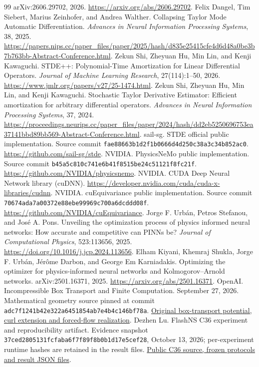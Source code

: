\documentclass[11pt]{article}
\begin{document}
\begin{thebibliography}{99}
arXiv:2606.29702, 2026.
\url{https://arxiv.org/abs/2606.29702}.
Felix Dangel, Tim Siebert, Marius Zeinhofer, and Andrea Walther.
Collapsing Taylor Mode Automatic Differentiation.
\emph{Advances in Neural Information Processing Systems}, 38, 2025.
\url{https://papers.nips.cc/paper_files/paper/2025/hash/d835e25415cfe4d6d48a0be3b7b763bb-Abstract-Conference.html}.
Zekun Shi, Zheyuan Hu, Min Lin, and Kenji Kawaguchi.
STDE++: Polynomial-Time Amortization for Linear Differential Operators.
\emph{Journal of Machine Learning Research}, 27(114):1--50, 2026.
\url{https://www.jmlr.org/papers/v27/25-1474.html}.
Zekun Shi, Zheyuan Hu, Min Lin, and Kenji Kawaguchi.
Stochastic Taylor Derivative Estimator: Efficient amortization for arbitrary differential operators.
\emph{Advances in Neural Information Processing Systems}, 37, 2024.
\url{https://proceedings.neurips.cc/paper_files/paper/2024/hash/dd2eb5250696753ea37141bbd89bb569-Abstract-Conference.html}.
sail-sg. STDE official public implementation.
Source commit \texttt{fae88663b1d2f1b0666d4d250c38a3c34b852ac0}.
\url{https://github.com/sail-sg/stde}.
NVIDIA. PhysicsNeMo public implementation.
Source commit \texttt{b45a5c810c741e6b41f8515be24c51121f8fc21f}.
\url{https://github.com/NVIDIA/physicsnemo}.
NVIDIA. CUDA Deep Neural Network library (cuDNN).
\url{https://developer.nvidia.com/cuda/cuda-x-libraries/cudnn}.
NVIDIA. cuEquivariance public implementation.
Source commit \texttt{70674ada7a00372e88ebe99969c700a6dcddd08f}.
\url{https://github.com/NVIDIA/cuEquivariance}.
Jorge F. Urbán, Petros Stefanou, and José A. Pons.
Unveiling the optimization process of physics informed neural networks: How accurate and competitive can PINNs be?
\emph{Journal of Computational Physics}, 523:113656, 2025.
\url{https://doi.org/10.1016/j.jcp.2024.113656}.
Elham Kiyani, Khemraj Shukla, Jorge F. Urbán, Jérôme Darbon, and George Em Karniadakis.
Optimizing the optimizer for physics-informed neural networks and Kolmogorov--Arnold networks.
arXiv:2501.16371, 2025.
\url{https://arxiv.org/abs/2501.16371}.
OpenAI. Incompressible Box Transport and Finite Computation.
September 27, 2026. Mathematical geometry source pinned at commit
\texttt{adc7f1241b42e322a6451854ab7e4b4c146bf78a}.
\href{https://github.com/openai/math/blob/adc7f1241b42e322a6451854ab7e4b4c146bf78a/preprints/Incompressible-Box-Transport-and-Finite-Computation-September-27-2026/build/geometry.tex}{Original box-transport potential, curl extension and forced-flow realization}.
Dezhen Lu. FlashNS C36 experiment and reproducibility artifact.
Evidence snapshot \texttt{37ced2805131fcfaba6f7f89f8b0b1d17e5cef28},
October 13, 2026; per-experiment runtime hashes are retained in the result files.
\href{https://github.com/0z5a/FlashNS/tree/37ced2805131fcfaba6f7f89f8b0b1d17e5cef28/research/c36-potential-proof}{Public C36 source, frozen protocols and result JSON files}.
\end{thebibliography}
\end{document}
